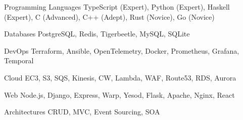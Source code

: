 

\begin{cvskills}

  \cvskill
    {Programming Languages} %
    {TypeScript (Expert), Python (Expert), Haskell (Expert), C (Advanced), C++ (Adept), Rust (Novice), Go (Novice)}

  \cvskill
    {Databases} %
    {PostgreSQL, Redis, Tigerbeetle, MySQL, SQLite} %

  \cvskill
    {DevOps} %
    {Terraform, Ansible, OpenTelemetry, Docker, Prometheus, Grafana, Temporal} %

  \cvskill
    {Cloud} %
    {EC3, S3, SQS, Kinesis, CW, Lambda, WAF, Route53, RDS, Aurora} %

  \cvskill
    {Web} %
    {Node.js, Django, Express, Warp, Yesod, Flask, Apache, Nginx, React} %

  \cvskill
    {Architectures} %
    {CRUD, MVC, Event Sourcing, SOA} %

\end{cvskills}
